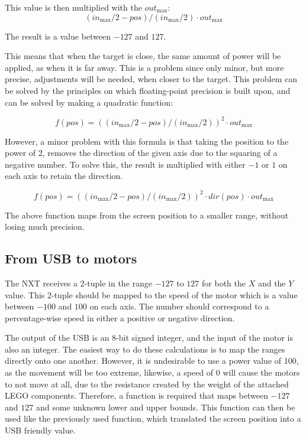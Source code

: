 This value is then multiplied with the $out_\text{max}$:
$$
(in_\text{max}/2 - pos)/(in_\text{max}/2) \cdot out_\text{max}
$$

The result is a value between $-127$ and $127$.

This means that when the target is close, the same amount of power will be applied, as when it is far away.
This is a problem since only minor, but more precise, adjustments will be needed, when closer to the target.
This problem can be solved by the principles on which floating-point precision is built upon, and can be solved by making a quadratic function:

$$
f(pos) = ((in_\text{max}/2 - pos)/(in_\text{max}/2))^2 \cdot out_\text{max}
$$

However, a minor problem with this formula is that taking the position to the power of 2, removes the direction of the given axis due to the squaring of a negative number.
To solve this, the result is multiplied with either $-1$ or $1$ on each axis to retain the direction.

$$
f(pos) = ((in_\text{max}/2 - pos)/(in_\text{max}/2))^2 \cdot dir(pos) \cdot out_\text{max}
$$

The above function maps from the screen position to a smaller range, without losing much precision.

\subsection{From USB to motors}
The NXT receives a 2-tuple in the range $-127$ to $127$ for both the $X$ and the $Y$ value.
This 2-tuple should be mapped to the speed of the motor which is a value between $-100$ and $100$ on each axis.
The number should correspond to a percentage-wise speed in either a positive or negative direction.

The output of the USB is an 8-bit signed integer, and the input of the motor is also an integer.
The easiest way to do these calculations is to map the ranges directly onto one another.
However, it is undesirable to use a power value of 100, as the movement will be too extreme, likewise, a speed of 0 will cause the motors to not move at all, due to the resistance created by the weight of the attached LEGO components.
Therefore, a function is required that maps between $-127$ and $127$ and some unknown lower and upper bounds.
This function can then be used like the previously used function, which translated the screen position into a USB friendly value.

